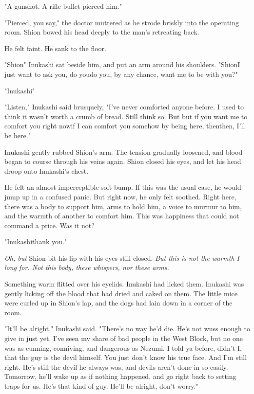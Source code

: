 "A gunshot. A rifle bullet pierced him."

"Pierced, you say," the doctor muttered as he strode briskly into the
operating room. Shion bowed his head deeply to the man's retreating
back.

He felt faint. He sank to the floor.

"Shion\el " Inukashi sat beside him, and put an arm around his shoulders.
"Shion\el I just want to ask you, do you\el do you, by any chance, want
me to be with you?"

"Inukashi\el "

"Listen," Inukashi said brusquely, "I've never comforted anyone before.
I used to think it wasn't worth a crumb of bread. Still think so. But\el 
but if you want me to comfort you right now\el if I can comfort you
somehow by being here, then\el then, I'll be here."

Inukashi gently rubbed Shion's arm. The tension gradually loosened, and
blood began to course through his veins again. Shion closed his eyes,
and let his head droop onto Inukashi's chest.

He felt an almost imperceptible soft bump. If this was the usual case,
he would jump up in a confused panic. But right now, he only felt
soothed. Right here, there was a body to support him, arms to hold him,
a voice to murmur to him, and the warmth of another to comfort him. This
was happiness that could not command a price. Was it not?

"Inukashi\el thank you."

\emph{Oh, but\el } Shion bit his lip with his eyes still closed. \emph{But this is not
the warmth I long for. Not this body, these whispers, nor these arms.}

Something warm flitted over his eyelids. Inukashi had licked them.
Inukashi was gently licking off the blood that had dried and caked on
them. The little mice were curled up in Shion's lap, and the dogs had
lain down in a corner of the room.

"It'll be alright," Inukashi said. "There's no way he'd die. He's not
wuss enough to give in just yet. I've seen my share of bad people in the
West Block, but no one was as cunning, conniving, and dangerous as
Nezumi. I told ya before, didn't I, that the guy is the devil himself.
You just don't know his true face. And I'm still right. He's still the
devil he always was, and devils aren't done in so easily. Tomorrow,
he'll wake up as if nothing happened, and go right back to setting traps
for us. He's that kind of guy. He'll be alright, don't worry."

